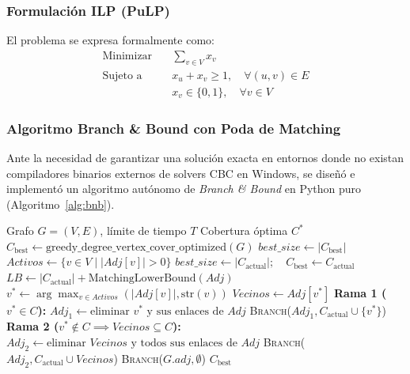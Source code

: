\documentclass[11pt,a4paper]{article}
\begin{document}
\subsubsection{Formulación ILP (PuLP)}
El problema se expresa formalmente como:
\begin{align}
	\text{Minimizar} \quad & \sum_{v \in V} x_v \\
	\text{Sujeto a} \quad & x_u + x_v \ge 1, \quad \forall (u, v) \in E \\
	& x_v \in \{0, 1\}, \quad \forall v \in V
\end{align}

\subsubsection{Algoritmo Branch \& Bound con Poda de Matching}
Ante la necesidad de garantizar una solución exacta en entornos donde no existan compiladores binarios externos de solvers CBC en Windows, se diseñó e implementó un algoritmo autónomo de \textit{Branch \& Bound} en Python puro (Algoritmo~\ref{alg:bnb}).

\begin{algorithm}[H]
\caption{Branch \& Bound Exacto con Poda por Cota de Matching}
\label{alg:bnb}
\begin{algorithmic}[1]
\Require Grafo $G = (V, E)$, límite de tiempo $T$
\Ensure Cobertura óptima $C^*$
\State $C_{\text{best}} \gets \text{greedy\_degree\_vertex\_cover\_optimized}(G)$ 
\State $best\_size \gets |C_{\text{best}}|$
	\State $Activos \gets \{v \in V \mid |Adj[v]| > 0\}$
			\State $best\_size \gets |C_{\text{actual}}|; \quad C_{\text{best}} \gets C_{\text{actual}}$
		\EndIf
		\State \Return
	\EndIf
	\State $LB \gets |C_{\text{actual}}| + \text{MatchingLowerBound}(Adj)$ 
		\State \Return {}
	\EndIf
	\State $v^* \gets \arg\max_{v \in Activos} (|Adj[v]|, \text{str}(v))$ 
	\State $Vecinos \gets Adj[v^*]$
	\State \textbf{Rama 1 ($v^* \in C$):}
	\State $Adj_1 \gets \text{eliminar } v^* \text{ y sus enlaces de } Adj$
	\State \textsc{Branch}($Adj_1, C_{\text{actual}} \cup \{v^*\}$)
	\State \textbf{Rama 2 ($v^* \notin C \implies Vecinos \subseteq C$):}
		\State $Adj_2 \gets \text{eliminar } Vecinos \text{ y todos sus enlaces de } Adj$
		\State \textsc{Branch}($Adj_2, C_{\text{actual}} \cup Vecinos$)
	\EndIf
\EndFunction
\State \textsc{Branch}($G.adj, \emptyset$)
\State \Return $C_{\text{best}}$
\end{algorithmic}
\end{algorithm}
\end{document}
